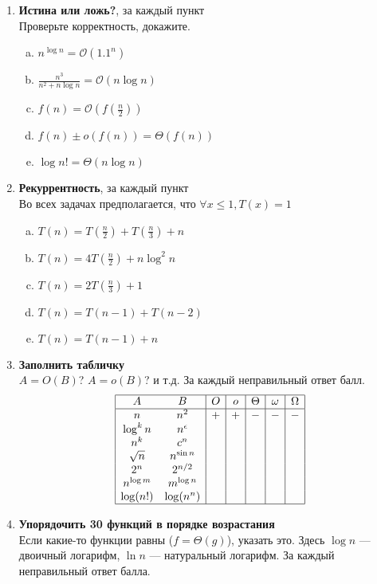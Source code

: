 \documentclass[12pt]{article}
\def\O{\mathcal{O}}           %
\renewcommand{\le}{\leqslant} %
\newcommand{\mfrac}[2]{{\textstyle\frac{#1}{#2}}}    %
\newcommand{\score}[1]{{\bf\color{red}{(#1)}}}
\newenvironment{MyList}[1][4pt]{
  \begin{enumerate}[1.]
  \setlength{\parskip}{0pt}
  \setlength{\itemsep}{#1}
}{       
  \end{enumerate}
}
\newenvironment{InnerMyList}[1][0pt]{
  \vspace*{-0.5em}
  \begin{enumerate}[a)]
  \setlength{\parskip}{#1}
  \setlength{\itemsep}{0pt}
}{
  \end{enumerate}
}
\begin{document}
\begin{MyList}[6pt]

  \item \score{2.5} {\bf Истина или ложь?}, \score{0.5} за каждый пункт\\
    Проверьте корректность, докажите.
    \begin{InnerMyList}
      \setcounter{enumii}{11}
      \item $n^{\log n} = \O(1.1^n)$
      \item $\frac{n^3}{n^2 + n \log n} = \O(n \log n)$
      \item $f(n) = \O(f(\frac{n}{2}))$
      \item $f(n) \pm o(f(n)) = \Theta(f(n))$
      \item $\log n! = \Theta(n \log n)$
    \end{InnerMyList}

  \item \score{2.5} {\bf Рекуррентность}, \score{0.5} за каждый пункт\\
    Во всех задачах предполагается, что $\forall x \le 1, T(x) = 1$
    \begin{InnerMyList}
      \setcounter{enumii}{6}
      \item $T(n) = T(\mfrac{n}{2}) + T(\mfrac{n}{3}) + n$
      \item $T(n) = 4T(\mfrac{n}{2}) + n \log^2 n$
      \item $T(n) = 2T(\mfrac{n}{3}) + 1$
      \item $T(n) = T(n - 1) + T(n - 2)$
      \item $T(n) = T(n - 1) + n$
    \end{InnerMyList}

  \item \score{3} {\bf Заполнить табличку}\\
    $A = O(B)$? $A = o(B)$? и т.д.
    За каждый неправильный ответ \score{${-}0.1$} балл.
$$
  \begin{array}{|cc|c|c|c|c|c|}
    \hline
    A & B & O & o & \Theta & \omega & \Omega \\
    \hline
    n & n^2 & + & + & - & - & - \\
    \log^k n & n^{\epsilon} & & & & & \\
    n^k & c^n & & & & & \\
    \sqrt{n} & n^{\sin n} & & & & & \\
    2^n & 2^{n \slash 2} & & & & & \\
    n^{\log m} & m^{\log n} & & & & & \\
    \log (n!) & \log(n^n) & & & & & \\
    \hline
  \end{array}
$$
  \item \score{6} {\bf Упорядочить 30 функций в порядке возрастания}\\
    Если какие-то функции равны ($f = \Theta(g)$), указать это.
    Здесь $\log n$ --- двоичный логарифм, $\ln n$ --- натуральный логарифм.
    За каждый неправильный ответ \score{${-}0.2$} балла.


\end{MyList}
\end{document}
